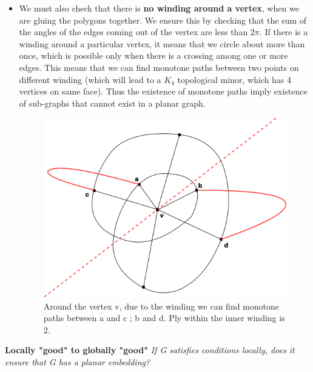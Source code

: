 \documentclass{article}
\begin{document}
\begin{itemize}
    
        \item We must also check that there is \textbf{no winding around a vertex}, when we are gluing the polygons together. We ensure this by checking that the sum of the angles of the edges coming out of the vertex are less than $2 \pi$. If there is a winding around a particular vertex, it means that we circle about more than once, which is possible only when there is a crossing among one or more edges. This means that we can find monotone paths between two points on different winding (which will lead to a $K_4$ topological minor, which has 4 vertices on same face). Thus the existence of monotone paths imply existence of sub-graphs that cannot exist in a planar graph.
        
        \begin{figure}[H]
        \centering
        \includegraphics[scale=0.5]{Images/winding_around_a_vertex.png}
        \caption{Around the vertex v, due to the winding we can find monotone paths between a and c ; b and d. Ply within the inner winding is 2. }
        \label{fig:my_label}
        \end{figure}
    \end{itemize} 
    

    
    \medskip \noindent \textbf {Locally "good" to globally "good"}
    \textit{If G satisfies conditions locally, does it ensure that G has a planar embedding?}
\end{document}
